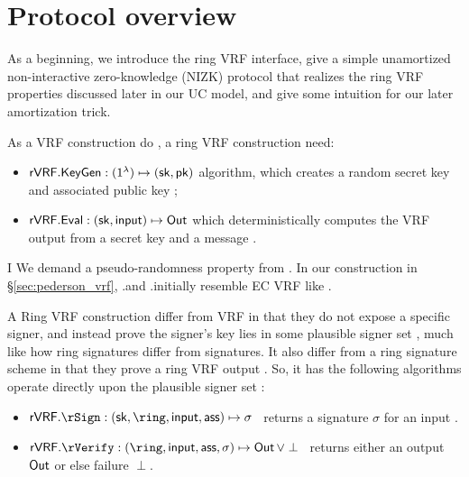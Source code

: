 \section{Protocol overview}
\label{sec:overview}

As a beginning, we introduce the ring VRF interface, give a simple
unamortized non-interactive zero-knowledge (NIZK) protocol that
realizes the ring VRF properties discussed later in our UC model,
and give some intuition for our later amortization trick.

As a VRF construction do \cite{vrf_micali}, a ring VRF construction need: 
\begin{itemize}
	\item ${\mathsf{rVRF}}.{\mathsf{KeyGen}} : (1^{\lambda}) \mapsto (\mathsf{sk}, \mathsf{pk})$ algorithm,
	which creates a random secret key \sk and associated public key \pk;
	
	\item ${\mathsf{rVRF}}.{\mathsf{Eval}} : (\mathsf{sk},\mathsf{input}) \mapsto {\ensuremath{\mathsf{Out}}}$ which deterministically computes the VRF output \Out from a secret key \sk and a message \msg.
\end{itemize}
%
I
We demand a pseudo-randomness property from \Eval. In our construction in \S\ref{sec:pederson_vrf},  \rVRF.\KeyGen and \rVRF.\Eval initially resemble EC VRF like \cite{nsec5,VXEd25519,draft-irtf-cfrg-vrf-10}.


A Ring VRF construction differ from VRF in that they do not expose a specific signer,
and instead prove the signer's key lies in some plausible signer set \ring,
much like how ring signatures differ from signatures.
It also differ from a ring signature scheme in that they prove a ring VRF output \Out.
So, it has the following algorithms operate directly upon
the plausible signer set \ring:
\begin{itemize}
	\item $\rVRF.\rSign : (\sk,\ring,\msg,\aux) \mapsto \sigma$ \,
	returns a signature $\sigma$ for an input \msg.
	\item $\rVRF.\rVerify : (\ring,\msg,\aux,\sigma) \mapsto \Out \, \lor \perp$ \,
	returns either an output ${\mathsf{Out}}$ or else failure $\perp$.
\end{itemize}

